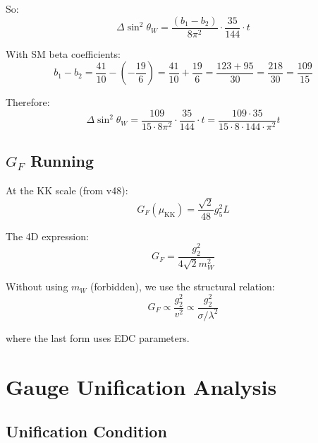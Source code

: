 \documentclass[11pt,a4paper]{article}
\begin{document}
So:
\begin{equation}
\label{eq:sin2-shift}
\Delta\sin^2\theta_W = \frac{(b_1 - b_2)}{8\pi^2}\cdot\frac{35}{144}\cdot t
\end{equation}

With SM beta coefficients:
\begin{equation}
\label{eq:b1-b2-numeric}
b_1 - b_2 = \frac{41}{10} - \left(-\frac{19}{6}\right) = \frac{41}{10} + \frac{19}{6} = \frac{123 + 95}{30} = \frac{218}{30} = \frac{109}{15}
\end{equation}

Therefore:
\begin{equation}
\label{eq:delta-sin2-final}
\Delta\sin^2\theta_W = \frac{109}{15 \cdot 8\pi^2}\cdot\frac{35}{144}\cdot t = \frac{109 \cdot 35}{15 \cdot 8 \cdot 144 \cdot \pi^2}t
\end{equation}

\subsection{$G_F$ Running}
\label{subsec:gf-running}

At the KK scale (from v48):
\begin{equation}
\label{eq:gf-kk}
G_F(\mu_{\text{KK}}) = \frac{\sqrt{2}}{48}g_5^2 L
\end{equation}

The 4D expression:
\begin{equation}
\label{eq:gf-4d}
G_F = \frac{g_2^2}{4\sqrt{2}m_W^2}
\end{equation}

Without using $m_W$ (forbidden), we use the structural relation:
\begin{equation}
\label{eq:gf-structural}
G_F \propto \frac{g_2^2}{v^2} \propto \frac{g_2^2}{\sigma/\lambda^2}
\end{equation}

where the last form uses EDC parameters.

\section{Gauge Unification Analysis}
\label{sec:unification}

\subsection{Unification Condition}
\label{subsec:unif-condition}
\end{document}

